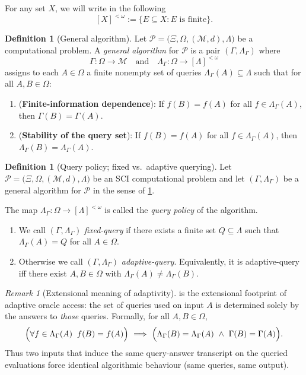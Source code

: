 \documentclass{lmcs} %
\theoremstyle{plain}
\theoremstyle{plain}
\theoremstyle{definition}
\newtheorem{definition}[theorem]{Definition}
\theoremstyle{remark}
\newtheorem{remark}[theorem]{Remark}
\theoremstyle{definition}
\theoremstyle{remark}
\numberwithin{equation}{section}
\begin{document}
For any set $X$, we will write in the following
\[
[X]^{<\omega} := \{E \subseteq X : E \text{ is finite}\}.
\]

\begin{definition}[General algorithm]\label{def:gen-alg}
Let $\mathcal{P}=\bigl( \Xi,\Omega,(\mathcal{M},d),\Lambda \bigr)$ be a computational problem.
A \textit{general algorithm} for $\mathcal{P}$ is a pair $(\Gamma,\Lambda_\Gamma)$ where
\[
\Gamma:\Omega\to \mathcal{M}
\quad\text{and}\quad
\Lambda_\Gamma:\Omega\to [\Lambda]^{<\omega}
\]
assigns to each $A\in\Omega$ a finite nonempty set of queries $\Lambda_\Gamma(A)\subseteq\Lambda$
such that for all $A,B\in\Omega$:\hfill
\begin{enumerate}
\item (\textbf{Finite-information dependence}): If $f(B)=f(A)$ for all $f\in\Lambda_\Gamma(A)$,
then $\Gamma(B)=\Gamma(A)$.
\item (\textbf{Stability of the query set}): If $f(B)=f(A)$ for all $f\in\Lambda_\Gamma(A)$,
then $\Lambda_\Gamma(B)=\Lambda_\Gamma(A)$.
\end{enumerate}
\end{definition}

\begin{definition}[Query policy; fixed vs.\ adaptive querying]\label{def:query-policy}
Let $\mathcal{P}=\bigl( \Xi,\Omega,(\mathcal{M},d),\Lambda \bigr)$ be an SCI computational problem and let $(\Gamma,\Lambda_\Gamma)$
be a general algorithm for $\mathcal{P}$ in the sense of \cref{def:gen-alg}.

The map $\Lambda_\Gamma:\Omega\to[\Lambda]^{<\omega}$ is called the
\textit{query policy} of the algorithm.

\begin{enumerate}
\item We call $(\Gamma,\Lambda_\Gamma)$ \textit{fixed-query} if there exists a finite set
$Q\subseteq\Lambda$ such that $\Lambda_\Gamma(A)=Q$ for all $A\in\Omega$.
\item Otherwise we call $(\Gamma,\Lambda_\Gamma)$ \textit{adaptive-query}.
Equivalently, it is adaptive-query iff there exist $A,B\in\Omega$ with
$\Lambda_\Gamma(A)\neq\Lambda_\Gamma(B)$.
\end{enumerate}
\end{definition}

\begin{remark}[Extensional meaning of adaptivity]\label{rem:extensional-adaptivity}
 is the extensional footprint of adaptive oracle access: the set of
queries used on input $A$ is determined solely by the answers to \textit{those} queries.
Formally, for all $A,B\in\Omega$,
\[
\Bigl(\forall f\in\Lambda_\Gamma(A)\;\; f(B)=f(A)\Bigr)
\ \Longrightarrow\
\Bigl(\Lambda_\Gamma(B)=\Lambda_\Gamma(A)\ \wedge\ \Gamma(B)=\Gamma(A)\Bigr).
\]
Thus two inputs that induce the same query-answer transcript on the queried evaluations
force identical algorithmic behaviour (same queries, same output).
\end{remark}
\end{document}

